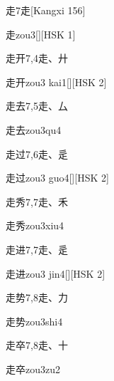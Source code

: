 \begin{entry}{走}{7}{⾛}[Kangxi 156]
  \begin{phonetics}{走}{zou3}[][HSK 1]
  \end{phonetics}
\end{entry}

\begin{entry}{走开}{7,4}{⾛、⼶}
  \begin{phonetics}{走开}{zou3 kai1}[][HSK 2]
  \end{phonetics}
\end{entry}

\begin{entry}{走去}{7,5}{⾛、⼛}
  \begin{phonetics}{走去}{zou3qu4}
  \end{phonetics}
\end{entry}

\begin{entry}{走过}{7,6}{⾛、⾡}
  \begin{phonetics}{走过}{zou3 guo4}[][HSK 2]
  \end{phonetics}
\end{entry}

\begin{entry}{走秀}{7,7}{⾛、⽲}
  \begin{phonetics}{走秀}{zou3xiu4}
  \end{phonetics}
\end{entry}

\begin{entry}{走进}{7,7}{⾛、⾡}
  \begin{phonetics}{走进}{zou3 jin4}[][HSK 2]
  \end{phonetics}
\end{entry}

\begin{entry}{走势}{7,8}{⾛、⼒}
  \begin{phonetics}{走势}{zou3shi4}
  \end{phonetics}
\end{entry}

\begin{entry}{走卒}{7,8}{⾛、⼗}
  \begin{phonetics}{走卒}{zou3zu2}
  \end{phonetics}
\end{entry}


